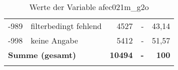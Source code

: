 \begin{longtable}{Xlrrr}
       -989 & filterbedingt fehlend & 4527 & - & 43,14 \\

       -998 & keine Angabe & 5412 & - & 51,57 \\

     \midrule
     \multicolumn{2}{l}{\textbf{Summe (gesamt)}} & \textbf{10494} & \textbf{-} & \textbf{100} \\
     \bottomrule
     \caption{Werte der Variable afec021m\_g2o}
     \end{longtable}
     
